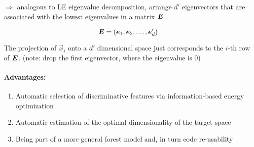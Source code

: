 \bigbreak
\(\Rightarrow\) analogous to LE eigenvalue decomposition, arrange \(d'\) eigenvectors that are associated with the lowest eigenvalues in a matrix $\bm{E}$.

\[\bm{E} = (\bm{e}_1, \bm{e}_2, \dots, \bm{e}_d')\]

The projection of \(\vec{x}_i\) onto a \(d'\) dimensional space just corresponds to the \(i\)-th row of \(\bm{E}\). (note: drop the first eigenvector, where the eigenvalue is 0)

\paragraph{Advantages:}
\begin{enumerate}
  \item Automatic selection of discriminative features via information-based energy optimization
  \item Automatic estimation of the optimal dimensionality of the target space
  \item Being part of a more general forest model and, in turn code re-usability
\end{enumerate}
